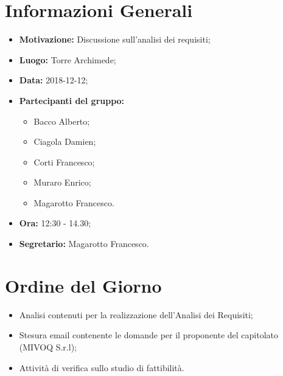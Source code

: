 \documentclass[a4paper, oneside, openany, dvipsnames, table]{article}
\begin{document}
\copertina{}


\newpage
\tableofcontents
\newpage

\section{Informazioni Generali}
\begin{itemize}
\item \textbf{Motivazione:} Discussione sull'analisi dei requisiti;
\item \textbf{Luogo:} Torre Archimede;
\item \textbf{Data:} 2018-12-12;
\item \textbf{Partecipanti del gruppo:}
	\begin{itemize}
	\item Bacco Alberto;
	\item Ciagola Damien;
	\item Corti Francesco;
	\item Muraro Enrico;
	\item Magarotto Francesco.
	\end{itemize} 
\item \textbf{Ora:} 12:30 - 14.30;
\item \textbf{Segretario:} Magarotto Francesco.
\end{itemize}

\section{Ordine del Giorno}
\begin{itemize}
\item Analisi contenuti per la realizzazione dell'Analisi dei Requisiti;
\item Stesura email contenente le domande per il proponente del capitolato (MIVOQ S.r.l);
\item Attività di verifica sullo studio di fattibilità.
\end{itemize}
\end{document}
